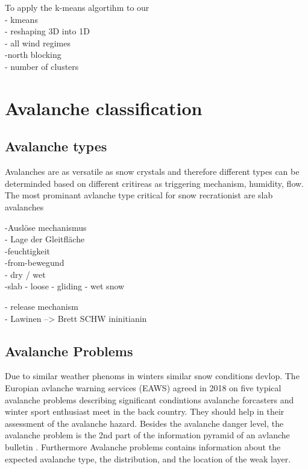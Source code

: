 To apply the k-means algortihm to our \\
- kmeans\\
- reshaping 3D into 1D \\
- all wind regimes \\
-north blocking \\
- number of clusters \\
 
\section{Avalanche classification} 

\subsection{Avalanche types}

Avalanches are as versatile as snow crystals and therefore different types can be determinded based on different critireas
as triggering mechanism, humidity, flow. The most prominant avlanche type critical for snow recrationist are slab avalanches


-Auslöse mechanismus \\
- Lage der Gleitfläche \\
-feuchtigkeit \\
-from-bewegund \\

- dry / wet \\
-slab - loose - gliding - wet snow

- release mechanism \\

- Lawinen --> Brett SCHW ininitianin\\



\subsection{Avalanche Problems}

Due to similar weather phenoms in winters similar snow conditions devlop. The Europian avlanche warning services (EAWS)
agreed in 2018 on five typical avalanche problems describing significant condintions avalanche forcasters and winter sport
enthusiast meet in the back country. They should help in their assessment of the avalanche hazard. Besides the avalanche danger level, the avalanche problem is the 2nd part of the information pyramid
of an avlanche bulletin \cite{mittererAusbildungshandbuchTirolerLawinenkommissionen2022}. Furthermore Avalanche problems
contains information about the expected avalanche type, the distribution, and the location of the weak layer. 

